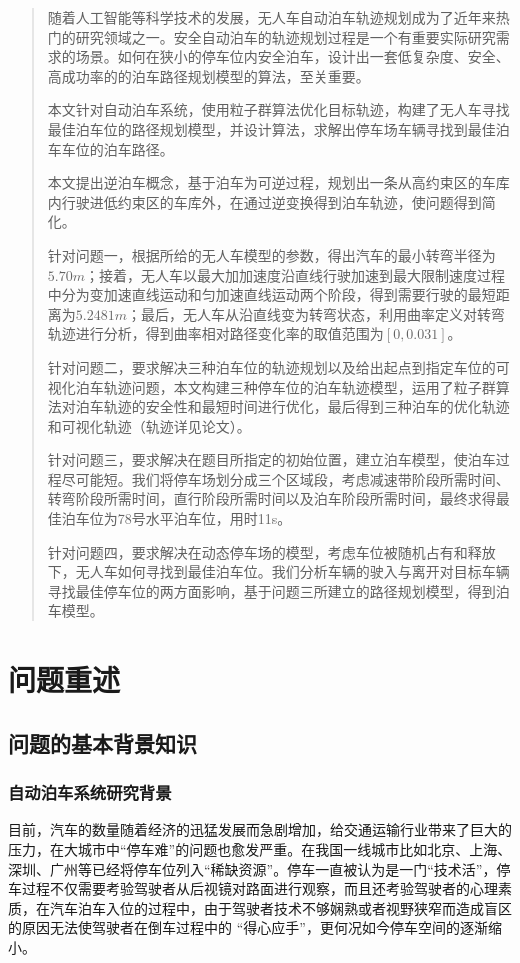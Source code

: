 \documentclass{MathorCupmodeling}
\begin{document}
\begin{abstract}
	随着人工智能等科学技术的发展，无人车自动泊车轨迹规划成为了近年来热门的研究领域之一。安全自动泊车的轨迹规划过程是一个有重要实际研究需求的场景。如何在狭小的停车位内安全泊车，设计出一套低复杂度、安全、高成功率的的泊车路径规划模型的算法，至关重要。

	本文针对自动泊车系统，使用粒子群算法优化目标轨迹，构建了无人车寻找最佳泊车位的路径规划模型，并设计算法，求解出停车场车辆寻找到最佳泊车车位的泊车路径。

	本文提出逆泊车概念，基于泊车为可逆过程，规划出一条从高约束区的车库内行驶进低约束区的车库外，在通过逆变换得到泊车轨迹，使问题得到简化。

	针对问题一，根据所给的无人车模型的参数，得出汽车的最小转弯半径为$5.70m$；接着，无人车以最大加加速度沿直线行驶加速到最大限制速度过程中分为变加速直线运动和匀加速直线运动两个阶段，得到需要行驶的最短距离为$5.2481m$；最后，无人车从沿直线变为转弯状态，利用曲率定义对转弯轨迹进行分析，得到曲率相对路径变化率的取值范围为$[0,0.031]$。

	针对问题二，要求解决三种泊车位的轨迹规划以及给出起点到指定车位的可视化泊车轨迹问题，本文构建三种停车位的泊车轨迹模型，运用了粒子群算法对泊车轨迹的安全性和最短时间进行优化，最后得到三种泊车的优化轨迹和可视化轨迹（轨迹详见论文）。

	针对问题三，要求解决在题目所指定的初始位置，建立泊车模型，使泊车过程尽可能短。我们将停车场划分成三个区域段，考虑减速带阶段所需时间、转弯阶段所需时间，直行阶段所需时间以及泊车阶段所需时间，最终求得最佳泊车位为78号水平泊车位，用时11s。

	针对问题四，要求解决在动态停车场的模型，考虑车位被随机占有和释放下，无人车如何寻找到最佳泊车位。我们分析车辆的驶入与离开对目标车辆寻找最佳停车位的两方面影响，基于问题三所建立的路径规划模型，得到泊车模型。
	\end{abstract}
	
	\setcounter{tocdepth}{2}
	\tableofcontents\newpage
	\section{问题重述}
	\subsection{问题的基本背景知识}
	\subsubsection{自动泊车系统研究背景}
	目前，汽车的数量随着经济的迅猛发展而急剧增加，给交通运输行业带来了巨大的压力，在大城市中“停车难”的问题也愈发严重。在我国一线城市比如北京、上海、深圳、广州等已经将停车位列入“稀缺资源”。停车一直被认为是一门“技术活”，停车过程不仅需要考验驾驶者从后视镜对路面进行观察，而且还考验驾驶者的心理素质，在汽车泊车入位的过程中，由于驾驶者技术不够娴熟或者视野狭窄而造成盲区的原因无法使驾驶者在倒车过程中的 “得心应手”，更何况如今停车空间的逐渐缩小。
	
\end{document}
